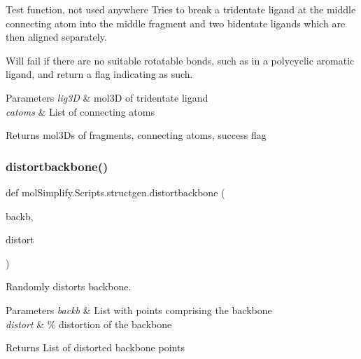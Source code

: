 Test function, not used anywhere Tries to break a tridentate ligand at the middle connecting atom into the middle fragment and two bidentate ligands which are then aligned separately. 

Will fail if there are no suitable rotatable bonds, such as in a polycyclic aromatic ligand, and return a flag indicating as such. 
\begin{DoxyParams}{Parameters}
{\em lig3D} & mol3D of tridentate ligand \\
\hline
{\em catoms} & List of connecting atoms \\
\hline
\end{DoxyParams}
\begin{DoxyReturn}{Returns}
mol3\+Ds of fragments, connecting atoms, success flag 
\end{DoxyReturn}
\mbox{\label{namespacemolSimplify_1_1Scripts_1_1structgen_a4f54c3884321f27f7791785de3a348d1}} 
\subsubsection{\texorpdfstring{distortbackbone()}{distortbackbone()}}
{\footnotesize\ttfamily def mol\+Simplify.\+Scripts.\+structgen.\+distortbackbone (\begin{DoxyParamCaption}\item[{}]{backb,  }\item[{}]{distort }\end{DoxyParamCaption})}



Randomly distorts backbone. 


\begin{DoxyParams}{Parameters}
{\em backb} & List with points comprising the backbone \\
\hline
{\em distort} & \% distortion of the backbone \\
\hline
\end{DoxyParams}
\begin{DoxyReturn}{Returns}
List of distorted backbone points 
\end{DoxyReturn}
\mbox{\label{namespacemolSimplify_1_1Scripts_1_1structgen_a1c48077780530e1f82a2048b3e4e47e2}} 
